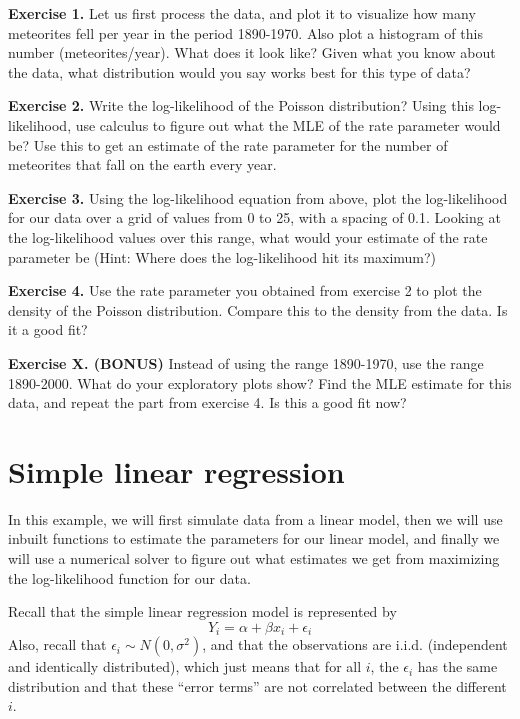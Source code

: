 \documentclass[
]{book}
\begin{document}
\textbf{Exercise 1.} Let us first process the data, and plot it to visualize how many meteorites fell per year in the period 1890-1970. Also plot a histogram of this number (meteorites/year). What does it look like? Given what you know about the data, what distribution would you say works best for this type of data?

\textbf{Exercise 2.} Write the log-likelihood of the Poisson distribution? Using this log-likelihood, use calculus to figure out what the MLE of the rate parameter would be? Use this to get an estimate of the rate parameter for the number of meteorites that fall on the earth every year.

\textbf{Exercise 3.} Using the log-likelihood equation from above, plot the log-likelihood for our data over a grid of values from 0 to 25, with a spacing of 0.1. Looking at the log-likelihood values over this range, what would your estimate of the rate parameter be (Hint: Where does the log-likelihood hit its maximum?)

\textbf{Exercise 4.} Use the rate parameter you obtained from exercise 2 to plot the density of the Poisson distribution. Compare this to the density from the data. Is it a good fit?

\textbf{Exercise X. (BONUS)} Instead of using the range 1890-1970, use the range 1890-2000. What do your exploratory plots show? Find the MLE estimate for this data, and repeat the part from exercise 4. Is this a good fit now?

\hypertarget{simple-linear-regression}{%
\section{Simple linear regression}\label{simple-linear-regression}}

In this example, we will first simulate data from a linear model, then we will use inbuilt functions to estimate the parameters for our linear model, and finally we will use a numerical solver to figure out what estimates we get from maximizing the log-likelihood function for our data.

Recall that the simple linear regression model is represented by \[Y_i = \alpha + \beta x_i + \epsilon_i\]
Also, recall that \(\epsilon_i \sim N(0, \sigma^2)\), and that the observations are i.i.d. (independent and identically distributed), which just means that for all \(i\), the \(\epsilon_i\) has the same distribution and that these ``error terms'' are not correlated between the different \(i\).
\end{document}
